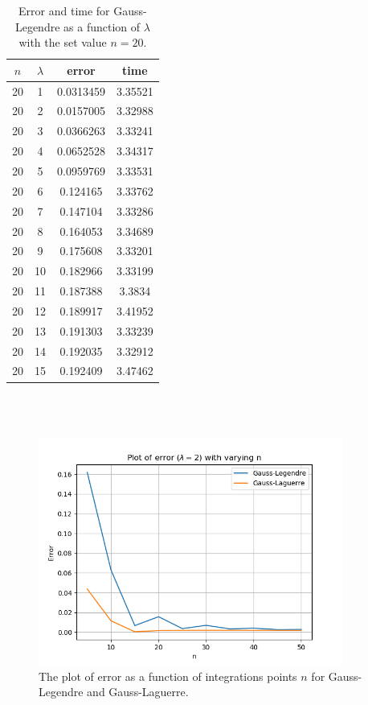 \documentclass{article}
\begin{document}
  \begin{table}[ht]
      \centering
      \caption{Error and time for Gauss-Legendre as a function of $\lambda$ with the set value $n = 20$. }
      \vspace{2mm}
      \label{tab:lambda}
      \begin{tabular}{|c|c|c|c|}
          \hline
          $n$ & $\lambda$ & error & time \\
          \hline \hline
          20 & 1 & 0.0313459 & 3.35521 \\
          20 & 2 & 0.0157005 & 3.32988 \\
          20 & 3 & 0.0366263 & 3.33241 \\
          20 & 4 & 0.0652528 & 3.34317 \\
          20 & 5 & 0.0959769 & 3.33531 \\
          20 & 6 & 0.124165 & 3.33762 \\
          20 & 7 & 0.147104 & 3.33286 \\
          20 & 8 & 0.164053 & 3.34689 \\
          20 & 9 & 0.175608 & 3.33201 \\
          20 & 10 & 0.182966 & 3.33199 \\
          20 & 11 & 0.187388 & 3.3834 \\
          20 & 12 & 0.189917 & 3.41952 \\
          20 & 13 & 0.191303 & 3.33239 \\
          20 & 14 & 0.192035 & 3.32912 \\
          20 & 15 & 0.192409 & 3.47462 \\
          \hline
        \end{tabular} \\
        \hspace{0pt}\\
    \end{table}

\newpage
\clearpage

  \begin{figure}[ht]
    \centering
    \includegraphics[width = 10cm]{images/error-integrationpoints.png}
    \caption{The plot of error as a function of integrations points $n$ for Gauss-Legendre and Gauss-Laguerre. }
    \label{fig:integrationpointspng}
  \end{figure}
\end{document}
